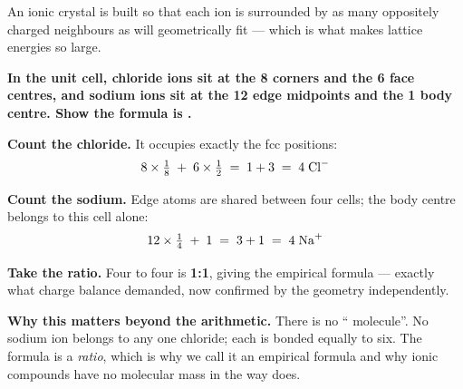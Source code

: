 \documentclass{apchem-worksheet}
\begin{document}
An ionic crystal is built so that each ion is surrounded by as many
oppositely charged neighbours as will geometrically fit --- which is
what makes lattice energies so large.

\begin{center}
\end{center}

\begin{workedexample}
\textbf{In the  unit cell, chloride ions sit at the 8 corners
and the 6 face centres, and sodium ions sit at the 12 edge midpoints and
the 1 body centre. Show the formula is .}

\textbf{Count the chloride.} It occupies exactly the fcc positions:
\[ 8 \times \tfrac{1}{8} \;+\; 6 \times \tfrac{1}{2} \;=\; 1 + 3
   \;=\; 4 \;\ce{Cl^-} \]

\textbf{Count the sodium.} Edge atoms are shared between four cells;
the body centre belongs to this cell alone:
\[ 12 \times \tfrac{1}{4} \;+\; 1 \;=\; 3 + 1 \;=\; 4 \;\ce{Na^+} \]

\textbf{Take the ratio.} Four to four is \textbf{1:1}, giving the
empirical formula  --- exactly what charge balance demanded, now
confirmed by the geometry independently.

\textbf{Why this matters beyond the arithmetic.} There is no
`` molecule''. No sodium ion belongs to any one chloride; each
is bonded equally to six. The formula is a \emph{ratio}, which is why we
call it an empirical formula and why ionic compounds have no molecular
mass in the way  does.
\end{workedexample}
\end{document}
